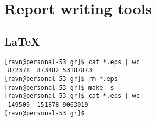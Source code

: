 \section{Report writing tools}

\subsection{\LaTeX}

\begin{verbatim}
[ravn@personal-53 gr]$ cat *.eps | wc
 872378  873482 53187873
[ravn@personal-53 gr]$ rm *.eps
[ravn@personal-53 gr]$ make -s
[ravn@personal-53 gr]$ cat *.eps | wc
 149509  151878 9063019
[ravn@personal-53 gr]$
\end{verbatim}

